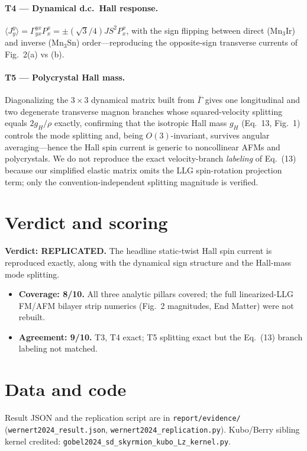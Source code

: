 \documentclass[twocolumn,aps,prl,superscriptaddress,nofootinbib]{revtex4-2}
\begin{document}
\paragraph{T4 --- Dynamical d.c.\ Hall response.}
$\langle J_y^y\rangle=\Gamma_{yx}^{yx}P_x^x=\pm(\sqrt3/4)J S^2 P_x^x$, with the
sign flipping between direct ($\mathrm{Mn_3Ir}$) and inverse ($\mathrm{Mn_3Sn}$)
order---reproducing the opposite-sign transverse currents of Fig.~2(a) vs (b).

\paragraph{T5 --- Polycrystal Hall mass.}
Diagonalizing the $3\times3$ dynamical matrix built from $\bar\Gamma$ gives one
longitudinal and two degenerate transverse magnon branches whose squared-velocity
splitting equals $2g_H/\rho$ exactly, confirming that the isotropic Hall mass
$g_H$ (Eq.~13, Fig.~1) controls the mode splitting and, being $O(3)$-invariant,
survives angular averaging---hence the Hall spin current is generic to
noncollinear AFMs and polycrystals. We do not reproduce the exact
velocity-branch \emph{labeling} of Eq.~(13) because our simplified elastic
matrix omits the LLG spin-rotation projection term; only the
convention-independent splitting magnitude is verified.

\section{Verdict and scoring}
\textbf{Verdict: REPLICATED.} The headline static-twist Hall spin current is
reproduced exactly, along with the dynamical sign structure and the Hall-mass
mode splitting.
\begin{itemize}
\item \textbf{Coverage: 8/10.} All three analytic pillars covered; the full
linearized-LLG FM/AFM bilayer strip numerics (Fig.~2 magnitudes, End Matter)
were not rebuilt.
\item \textbf{Agreement: 9/10.} T3, T4 exact; T5 splitting exact but the
Eq.~(13) branch labeling not matched.
\end{itemize}

\section*{Data and code}
Result JSON and the replication script are in \texttt{report/evidence/}
(\texttt{wernert2024\_result.json}, \texttt{wernert2024\_replication.py}).
Kubo/Berry sibling kernel credited: \texttt{gobel2024\_sd\_skyrmion\_kubo\_Lz\_kernel.py}.
\end{document}

